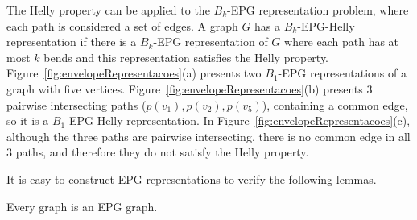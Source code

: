 \documentclass[runningheads]{llncs}
\begin{document}
The Helly property can be applied to the $ B_k $-EPG representation problem, where each path is considered a set of edges. A graph $ G $ has a  $ B_k$-EPG-Helly representation if there is a $ B_k $-EPG representation of $G$ where each path has at most $ k $ bends and this representation satisfies the Helly property. %
 Figure~\ref{fig:envelopeRepresentacoes}(a) presents two $B_1$-EPG representations of a graph with five vertices.  Figure~\ref{fig:envelopeRepresentacoes}(b)   presents 3 pairwise intersecting paths ($p(v_1), p(v_2), p(v_5)$), containing a common edge, so it is a $ B_1$-EPG-Helly representation. In Figure~\ref{fig:envelopeRepresentacoes}(c), although the three paths are pairwise intersecting, there is no common edge in all 3 paths, and therefore they do not satisfy the Helly property. 





 
 It is easy to construct EPG representations to verify the following lemmas.
 
 \begin{lemma} \cite{golumbic2009} \label{lem:todoGrafoEpg}
 Every graph is an EPG graph.
 \end{lemma}
 
 
\end{document}
